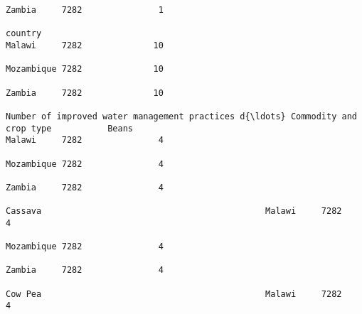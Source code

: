 \documentclass[11pt]{article}
\begin{document}
\begin{Verbatim}[commandchars=\\\{\}]
                                                                                                                                                                                                                 Zambia     7282               1  
                                                                                                                            country                                                                              Malawi     7282              10  
                                                                                                                                                                                                                 Mozambique 7282              10  
                                                                                                                                                                                                                 Zambia     7282              10  
                                                                         Number of improved water management practices d{\ldots} Commodity and crop type           Beans                                              Malawi     7282               4  
                                                                                                                                                                                                                 Mozambique 7282               4  
                                                                                                                                                                                                                 Zambia     7282               4  
                                                                                                                                                              Cassava                                            Malawi     7282               4  
                                                                                                                                                                                                                 Mozambique 7282               4  
                                                                                                                                                                                                                 Zambia     7282               4  
                                                                                                                                                              Cow Pea                                            Malawi     7282               4  

\end{Verbatim}
\end{document}
